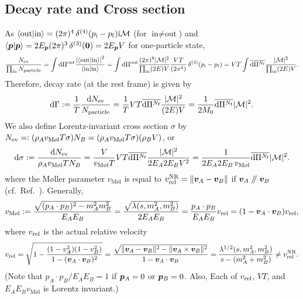 \documentclass[CheatSheet]{subfiles}
\begin{document}
\subsection{Decay rate and Cross section}
As
$\braket{\text{out}|\text{in}}=(2\pi)^4\diracdelta[4](p\w i-p\w f)\ii\mathcal M$
(for $\text{in}\neq\text{out}$) and $\braket{\vc p|\vc p}=2E_{\vc p}(2\pi)^3\diracdelta[3](\vc 0)=2E_\vc {p}V$ for one-particle state,
\begin{equation}
 \frac{N\w{ev}}{\prod\w{in} N\w{particle}}
= \int\dd\Pi^{\mathrm{out}}\frac{\left|\braket{\text{out}|\text{in}}\right|^2}{\braket{\text{in}|\text{in}}}
= \int\dd\Pi^{\mathrm{out}}\frac{(2\pi)^8|\mathcal M|^2}{\prod\w{in}(2E)V}
\frac{VT}{(2\pi^4)}\diracdelta[4](p\w i-p\w f)
= VT\int\overline{\dd\Pi^{N\w f}}\frac{|\mathcal M|^2}{\prod\w{in}(2E)V}.
\end{equation}
Therefore, decay rate (at the rest frame) is given by
\begin{equation}
 \mathop{}\!\mathrm{d}\Gamma
:= \frac{1}{T}\frac{\mathop{}\!\mathrm{d} N_{\mathrm{ev}}}{N_{\mathrm{particle}}}
 = \frac{1}{T}VT\overline{\mathop{}\!\mathrm{d}\Pi^{N_{\mathrm{f}}}}\frac{|\mathcal M|^2}{(2E)V}
 = \frac{1}{2M_0}\overline{\mathop{}\!\mathrm{d}\Pi^{N_{\mathrm{f}}}}{|\mathcal M|^2}.
\end{equation}
We also define Lorentz-invariant cross section $\sigma$ by $N\w{ev}=:(\rho_A v_{\text{M\o l}}T\sigma)N_B=(\rho_A v_{\text{M\o l}}T\sigma)(\rho_B V)$, or
\begin{equation}
\dd\sigma:=\frac{\dd N\w{ev}}{\rho_A v_{\text{M\o l}}TN_B}
=
\frac{V}{v_{\text{M\o l}}T}
VT\overline{\dd\Pi^{N\w f}}\frac{|\mathcal M|^2}{2E_A2E_BV^2}
=
\frac{1}{2E_A2E_B\,v_{\text{M\o l}}}
\overline{\dd\Pi^{N\w f}}|\mathcal M|^2.
\end{equation}
where the M\o ller parameter $v_{\text{M\o l}}$ is equal to $v^{\mathrm{NR}}_{\mathrm{rel}}=\|{\boldsymbol{v}}_A-{\boldsymbol{v}}_B\|$ if ${\boldsymbol{v}}_A\mathrel{/\mkern-5mu/}{\boldsymbol{v}}_B$ (cf.~Ref.~\cite{Cannoni:2016hro}).
Generally,
\begin{equation}
  v_{\text{M\o l}}:=
 \frac{\sqrt{(p_A\cdot p_B)^2-m_A^2m_B^2}}{E_AE_B}
=\frac{\sqrt{\Kallen(s,m_A^2,m_B^2)}}{2E_AE_B}
=\frac{p_A\cdot p_B}{E_A E_B}v\w{rel}
=({1-\vc v_A\cdot\vc v_B})v\w{rel},
\end{equation}
where $v_{\mathrm{rel}}$ is the actual relative velocity
\begin{equation}
  v_{\mathrm{rel}}
=\sqrt{1-\frac{(1-v_A^2)(1-v_B^2)}{1-({\boldsymbol{v}}_A\cdot{\boldsymbol{v}}_B)^2}}
=\frac{\sqrt{\|{\boldsymbol{v}}_A-{\boldsymbol{v}}_B\|^2-\|{\boldsymbol{v}}_A\times{\boldsymbol{v}}_B\|^2}}{1-{\boldsymbol{v}}_A\cdot{\boldsymbol{v}}_B}
=\frac{\mathop{\lambda^{1/2}}(s,m_A^2,m_B^2)}{s-(m_A^2+m_B^2)}\neq v^{\mathrm{NR}}_{\mathrm{rel}}.
\end{equation}
(Note that $p_A\cdot p_B/E_AE_B=1$ if ${\boldsymbol{p}}_A=0$ or ${\boldsymbol{p}}_B=0$. Also, Each of $v_{\mathrm{rel}}$, $VT$, and $E_AE_Bv_{\text{M\o l}}$ is Lorentz invariant.)
\end{document}

